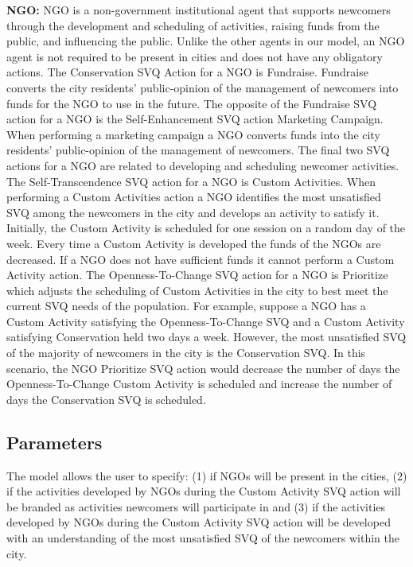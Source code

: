 \documentclass{scspaperproc}
\theoremstyle{scsthe}
\begin{document}
{\bf NGO:} NGO is a non-government institutional agent that supports newcomers through the development and scheduling of activities, raising funds from the public, and influencing the public. Unlike the other agents in our model, an NGO agent is not required to be present in cities and does not have any obligatory actions. The Conservation SVQ Action for a NGO is Fundraise. Fundraise converts the city residents' public-opinion of the management of newcomers into funds for the NGO to use in the future. The opposite of the Fundraise SVQ action for a NGO is the Self-Enhancement SVQ action Marketing Campaign. When performing a marketing campaign a NGO converts funds into the city residents' public-opinion of the management of newcomers. The final two SVQ actions for a NGO are related to developing and scheduling newcomer activities. The Self-Transcendence SVQ action for a NGO is Custom Activities. When performing a Custom Activities action a NGO identifies the most unsatisfied SVQ among the newcomers in the city and develops an activity to satisfy it. Initially, the Custom Activity is scheduled for one session on a random day of the week. Every time a Custom Activity is developed the funds of the NGOs are decreased. If a NGO does not have sufficient funds it cannot perform a Custom Activity action. The Openness-To-Change SVQ action for a NGO is Prioritize which adjusts the scheduling of Custom Activities in the city to best meet the current SVQ needs of the population. For example, suppose a NGO has a Custom Activity satisfying the Openness-To-Change SVQ and a Custom Activity satisfying Conservation held two days a week. However, the most unsatisfied SVQ of the majority of newcomers in the city is the Conservation SVQ. In this scenario, the NGO Prioritize SVQ action would decrease the number of days the Openness-To-Change Custom Activity is scheduled and increase the number of days the Conservation SVQ is scheduled.

\subsection{Parameters}
The model allows the user to specify: (1) if NGOs will be present in the cities, (2) if the activities developed by NGOs during the Custom Activity SVQ action will be branded as activities newcomers will participate in and (3) if the activities developed by NGOs during the Custom Activity SVQ action will be developed with an understanding of the most unsatisfied SVQ of the newcomers within the city. 
\end{document}
